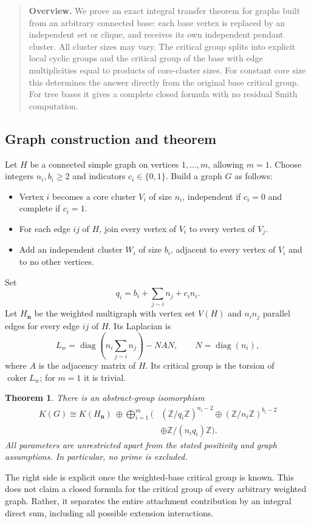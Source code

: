 \documentclass[11pt,a4paper]{article}
\newtheorem{theorem}{Theorem}[section]
\theoremstyle{definition}\newtheorem{definition}[theorem]{Definition}
\theoremstyle{remark}\newtheorem{remark}[theorem]{Remark}
\newcommand{\Z}{\mathbb Z}\newcommand{\Q}{\mathbb Q}\newcommand{\F}{\mathbb F}
\DeclareMathOperator{\coker}{coker}\DeclareMathOperator{\diag}{diag}\DeclareMathOperator{\rank}{rank}
\numberwithin{equation}{section}
\begin{document}
\begin{quote}\small\textbf{Overview.} We prove an exact integral transfer theorem for graphs built from an arbitrary connected base: each base vertex is replaced by an independent set or clique, and receives its own independent pendant cluster. All cluster sizes may vary. The critical group splits into explicit local cyclic groups and the critical group of the base with edge multiplicities equal to products of core-cluster sizes. For constant core size this determines the answer directly from the original base critical group. For tree bases it gives a complete closed formula with no residual Smith computation.\end{quote}

\subsection{Graph construction and theorem}\label{K08-sec-1}
Let $H$ be a connected simple graph on vertices $1,\ldots,m$, allowing $m=1$. Choose integers $n_i,b_i\geq2$ and indicators $c_i\in\{0,1\}$. Build a graph $G$ as follows:
\begin{itemize}
\item Vertex $i$ becomes a core cluster $V_i$ of size $n_i$, independent if $c_i=0$ and complete if $c_i=1$.
\item For each edge $ij$ of $H$, join every vertex of $V_i$ to every vertex of $V_j$.
\item Add an independent cluster $W_i$ of size $b_i$, adjacent to every vertex of $V_i$ and to no other vertices.
\end{itemize}
Set
\[
 q_i=b_i+\sum_{j\sim i}n_j+c_in_i.
\]
Let $H_{\mathbf n}$ be the weighted multigraph with vertex set $V(H)$ and $n_in_j$ parallel edges for every edge $ij$ of $H$. Its Laplacian is
\[
 L_w=\diag\left(n_i\sum_{j\sim i}n_j\right)-NAN,
 \qquad N=\diag(n_i),                                       \tag{K08.1}
\]
where $A$ is the adjacency matrix of $H$. Its critical group is the torsion of $\coker L_w$; for $m=1$ it is trivial.
\begin{theorem}\label{K08-transfer}
There is an abstract-group isomorphism
\begin{align*}
 K(G)\cong K(H_{\mathbf n})\ \oplus
 \bigoplus_{i=1}^m\bigl(& (\Z/q_i\Z)^{n_i-2}
 \oplus(\Z/n_i\Z)^{b_i-2}\\
 &\oplus\Z/(n_iq_i)\Z\bigr).                               \tag{K08.2}
\end{align*}
All parameters are unrestricted apart from the stated positivity and graph assumptions. In particular, no prime is excluded.
\end{theorem}
The right side is explicit once the weighted-base critical group is known. This does not claim a closed formula for the critical group of every arbitrary weighted graph. Rather, it separates the entire attachment contribution by an integral direct sum, including all possible extension interactions.
\end{document}

